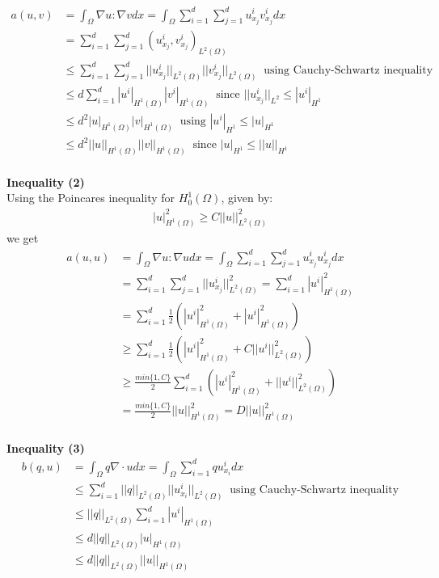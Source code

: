 \documentclass[11pt,a4paper]{report}
\begin{document}
\begin{align*}
a(u,v)&= \int_{\Omega}\nabla u : \nabla v dx=\int_{\Omega}\sum_{i=1}^d\sum_{j=1}^d u_{x_j}^iv_{x_j}^idx \\
&=\sum_{i=1}^d\sum_{j=1}^d (u_{x_j}^i,v_{x_j}^i)_{L^2(\Omega)} \\
&\leq \sum_{i=1}^d\sum_{j=1}^d ||u_{x_j}^i||_{L^2(\Omega)}||v_{x_j}^i||_{L^2(\Omega)} \ \text{  using Cauchy-Schwartz inequality}  \\
&\leq d \sum_{i=1}^d |u^i|_{H^1(\Omega)}|v^i|_{H^1(\Omega)} \ \text{ since $||u_{x_j}^i||_{L^2} \leq |u^i|_{H^1}$} \\
&\leq d^2 |u|_{H^1(\Omega)}|v|_{H^1(\Omega)} \ \text{        using $|u^i|_{H^1} \leq |u|_{H^1}$} \\
&\leq d^2 ||u||_{H^1(\Omega)}||v||_{H^1(\Omega)} \ \text{    since $|u|_{H^1}\leq ||u||_{H^1}$ } 
\end{align*}
\\
\textbf{Inequality (2)}
\\
Using the Poincares inequality for $H_0^1(\Omega)$, given by: 
\begin{align*}
|u|_{H^1(\Omega)}^2\geq C||u||_{L^2(\Omega)}^2
\end{align*} 
we get 
\begin{align*}
a(u,u)&= \int_{\Omega}\nabla u : \nabla u dx=\int_{\Omega}\sum_{i=1}^d\sum_{j=1}^d u_{x_j}^iu_{x_j}^idx \\
&=\sum_{i=1}^d\sum_{j=1}^d ||u_{x_j}^i||_{L^2(\Omega)}^2=\sum_{i=1}^d |u^i|_{H^1(\Omega)}^2\\
&= \sum_{i=1}^d\frac{1}{2}(|u^i|_{H^1(\Omega)}^2+|u^i|_{H^1(\Omega)}^2) \\
&\geq \sum_{i=1}^d\frac{1}{2}(|u^i|_{H^1(\Omega)}^2+C||u^i||_{L^2(\Omega)}^2) \\
&\geq \frac{min\{1,C\}}{2}\sum_{i=1}^d(|u^i|_{H^1(\Omega)}^2+||u^i||_{L^2(\Omega)}^2) \\
&= \frac{min\{1,C\}}{2}||u||_{H^1(\Omega)}^2=D||u||_{H^1(\Omega)}^2
\end{align*}
\\
\textbf{Inequality (3)}
\begin{align*}
b(q,u)&=\int_{\Omega} q\nabla \cdot u dx=\int_{\Omega}\sum_{i=1}^d qu_{x_i}^i dx \\
&\leq \sum_{i=1}^d ||q||_{L^2(\Omega)} ||u_{x_i}^i||_{L^2(\Omega)} \ \text{  using Cauchy-Schwartz inequality}  \\
&\leq ||q||_{L^2(\Omega)}\sum_{i=1}^d |u^i|_{H^1(\Omega)} \\
&\leq d||q||_{L^2(\Omega)}|u|_{H^1(\Omega)} \\
&\leq d||q||_{L^2(\Omega)}||u||_{H^1(\Omega)}
\end{align*}
\end{document}
